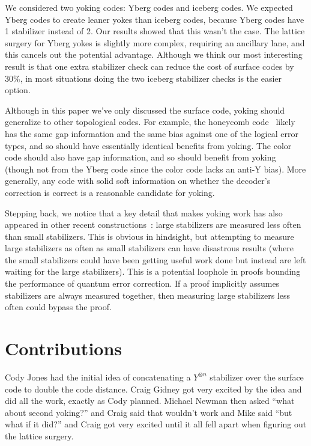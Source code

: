 \documentclass[onecolumn,unpublished,a4paper]{quantumarticle}
\theoremstyle{definition}
\theoremstyle{definition}
\theoremstyle{definition}
\begin{document}
We considered two yoking codes: Yberg codes and iceberg codes.
We expected Yberg codes to create leaner yokes than iceberg codes, because Yberg codes have 1 stabilizer instead of 2.
Our results showed that this wasn't the case.
The lattice surgery for Yberg yokes is slightly more complex, requiring an ancillary lane, and this cancels out the potential advantage.
Although we think our most interesting result is that one extra stabilizer check can reduce the cost of surface codes by 30\%, in most situations doing the two iceberg stabilizer checks is the easier option.

Although in this paper we've only discussed the surface code, yoking should generalize to other topological codes.
For example, the honeycomb code~\cite{hastings2021dynamically,gidney2022honeycombplanar} likely has the same gap information and the same bias against one of the logical error types, and so should have essentially identical benefits from yoking.
The color code should also have gap information, and so should benefit from yoking (though not from the Yberg code since the color code lacks an anti-Y bias).
More generally, any code with solid soft information on whether the decoder's correction is correct is a reasonable candidate for yoking.

Stepping back, we notice that a key detail that makes yoking work has also appeared in other recent constructions~\cite{berthusen2023partialmeasure,lessbaconmorethreshold2023}: large stabilizers are measured less often than small stabilizers.
This is obvious in hindsight, but attempting to measure large stabilizers as often as small stabilizers can have disastrous results (where the small stabilizers could have been getting useful work done but instead are left waiting for the large stabilizers).
This is a potential loophole in proofs bounding the performance of quantum error correction.
If a proof implicitly assumes stabilizers are always measured together, then measuring large stabilizers less often could bypass the proof.



\section{Contributions}

Cody Jones had the initial idea of concatenating a $Y^{\otimes n}$ stabilizer over the surface code to double the code distance.
Craig Gidney got very excited by the idea and did all the work, exactly as Cody planned.
Michael Newman then asked ``what about second yoking?'' and Craig said that wouldn't work and Mike said ``but what if it did?'' and Craig got very excited until it all fell apart when figuring out the lattice surgery.
\end{document}
